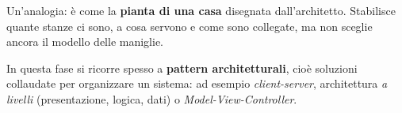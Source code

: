 
Un'analogia: è come la \textbf{pianta di una casa} disegnata dall'architetto. Stabilisce quante stanze ci sono, a cosa servono e come
sono collegate, ma non sceglie ancora il modello delle maniglie.

In questa fase si ricorre spesso a \textbf{pattern architetturali}, cioè soluzioni collaudate per organizzare un sistema:
ad esempio \textit{client-server}, architettura \textit{a livelli} (presentazione, logica, dati) o \textit{Model-View-Controller}.

